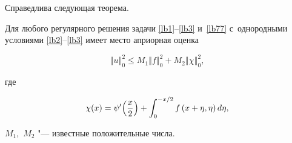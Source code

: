 Справедлива следующая теорема.

\begin{theorem}[1]Для любого регулярного решения задачи \eqref{lb1}--\eqref{lb3} и~\eqref{lb77} с~однородными условиями \eqref{lb2}--\eqref{lb3} имеет место априорная оценка

\[

\left\Vert u \right\Vert_{0}^{2} \leqslant M_1 \left\Vert f \right\Vert_{0}^{2}+M_2 \left\Vert \chi \right\Vert_{0}^{2},

\]

где 

$$\chi(x)=\psi'\Bigl(\frac{x}{2}\Bigr)+\int _{0}^{-x/2}f \left(x+\eta,\eta\right)d\eta,$$

$M_1,$ $M_2$ "--- известные положительные числа$.$

\end{theorem}



